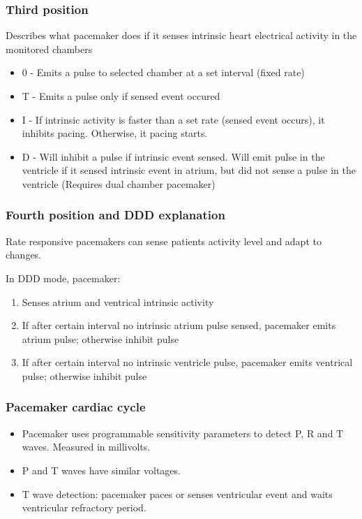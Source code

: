 \documentclass[xcolor=dvipsnames]{beamer}
\begin{document}
  \begin{frame}
    \frametitle{Third position}
    Describes what pacemaker does if it senses intrinsic heart electrical activity in the monitored chambers
  \begin{itemize}
    \item 0 - Emits a pulse to selected chamber at a set interval (fixed rate)
    \item T - Emits a pulse only if sensed event occured
    \item I - If intrinsic activity is faster than a set rate (sensed event occurs), it inhibits pacing. Otherwise, it pacing starts.
    \item D - Will inhibit a pulse if intrinsic event sensed. Will emit pulse in the ventricle if it sensed intrinsic event in atrium, but did not sense a pulse in the ventricle (Requires dual chamber pacemaker)
  \end{itemize}

  \end{frame}

  \begin{frame}
    \frametitle{Fourth position and DDD explanation}
    Rate responsive pacemakers can sense patients activity level and adapt to changes.\par
    
    \hrulefill\par 
    In DDD mode, pacemaker:
    \begin{enumerate}
      \item Senses atrium and ventrical intrinsic activity
      \item If after certain interval no intrinsic atrium pulse sensed, pacemaker emits atrium pulse; otherwise inhibit pulse
      \item If after certain interval no intrinsic ventricle pulse, pacemaker emits ventrical pulse; otherwise inhibit pulse
    \end{enumerate}

  \end{frame}

  \begin{frame}
    \frametitle{Pacemaker cardiac cycle}
    \begin{itemize}
      \item Pacemaker uses programmable sensitivity parameters to detect P, R and T waves. Measured in millivolts.
      \item P and T waves have similar voltages.
      \item T wave detection: pacemaker paces or senses ventricular event and waits ventricular refractory period.
    \end{itemize}
  \end{frame}
  
\end{document}
